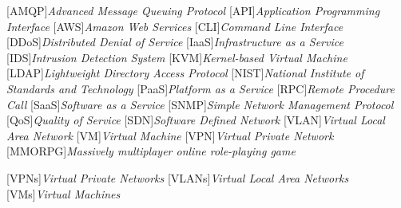 \begin{acronym}[]
	[AMQP]{{\it Advanced Message Queuing Protocol}}
	[API]{{\it Application Programming Interface}}
    [AWS]{{\it Amazon Web Services}}
	[CLI]{{\it Command Line Interface}}
	[DDoS]{{\it Distributed Denial of Service}}
	[IaaS]{{\it Infrastructure as a Service}}
    [IDS]{{\it Intrusion Detection System}}
	[KVM]{{\it Kernel-based Virtual Machine}}
    [LDAP]{{\it Lightweight Directory Access Protocol}}
	[NIST]{{\it National Institute of Standards and Technology}}
	[PaaS]{{\it Platform as a Service}}
    [RPC]{{\it Remote Procedure Call}}
	[SaaS]{{\it Software as a Service}}
	[SNMP]{{\it Simple Network Management Protocol}}
	[QoS]{{\it Quality of Service}}
	[SDN]{{\it Software Defined Network}}
	[VLAN]{{\it Virtual Local Area Network}}
	[VM]{{\it Virtual Machine}}
	[VPN]{{\it Virtual Private Network}}
	[MMORPG]{{\it Massively multiplayer online role-playing game}}

	[VPNs]{{\it Virtual Private Networks}}
	[VLANs]{{\it Virtual Local Area Networks}}
	[VMs]{{\it Virtual Machines}}
\end{acronym}

